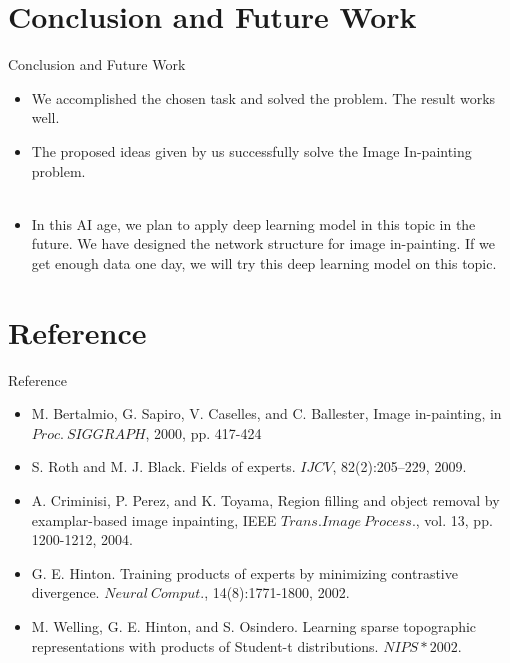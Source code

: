\documentclass{beamer}
\begin{document}
\section{Conclusion and Future Work}
\begin{frame}{Conclusion and Future Work}
	\begin{itemize}
		\item We accomplished the chosen task and solved the problem. The result works well.
		\item The proposed ideas given by us successfully solve the Image In-painting problem.\\\ \\ 
		\item In this AI age, we plan to apply deep learning model in this topic in the future. We have designed the network structure for image in-painting. If we get enough data one day, we will try this deep learning model on this topic.
	\end{itemize}
\end{frame}
%
\section*{Reference}
\begin{frame}{Reference}
	\begin{itemize}
		\item M. Bertalmio, G. Sapiro, V. Caselles, and C. Ballester, Image in-painting, in $Proc.\ SIGGRAPH$, 2000, pp. 417-424
		\item S. Roth and M. J. Black. Fields of experts. $IJCV$, 82(2):205–229,
		2009.
		\item A. Criminisi, P. Perez, and K. Toyama, Region filling and object
		removal by examplar-based image inpainting, IEEE $Trans. Image\ 
		Process.$, vol. 13, pp. 1200-1212, 2004.
		\item G. E. Hinton. Training products of experts by minimizing contrastive
		divergence. $Neural\ Comput.$, 14(8):1771-1800, 2002.
		\item M. Welling, G. E. Hinton, and S. Osindero. Learning sparse topographic representations with products of Student-t distributions.
		$NIPS*2002$.
	\end{itemize}
\end{frame}
\end{document}
